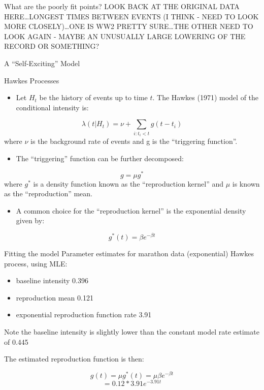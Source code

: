 \documentclass[
  ignorenonframetext,
]{beamer}
\providecommand{\tightlist}{%
  \setlength{\itemsep}{0pt}\setlength{\parskip}{0pt}}
\begin{document}
\begin{frame}{What are the poorly fit points?}
\protect\hypertarget{what-are-the-poorly-fit-points}{}
LOOK BACK AT THE ORIGINAL DATA HERE\ldots LONGEST TIMES BETWEEN EVENTS
(I THINK - NEED TO LOOK MORE CLOSELY)\ldots ONE IS WW2 PRETTY
SURE\ldots THE OTHER NEED TO LOOK AGAIN - MAYBE AN UNUSUALLY LARGE
LOWERING OF THE RECORD OR SOMETHING?
\end{frame}

\begin{frame}{A ``Self-Exciting'' Model}
\protect\hypertarget{a-self-exciting-model}{}
\begin{block}{Hawkes Processes}
\protect\hypertarget{hawkes-processes}{}
\begin{itemize}
\tightlist
\item
  Let \(H_t\) be the history of events up to time \(t\). The Hawkes
  (1971) model of the conditional intensity is:
\end{itemize}

\[\lambda(t|H_t) = \nu + \sum_{i:t_i<t} g(t - t_i)\] where \(\nu\) is
the background rate of events and g is the ``triggering function''.

\begin{itemize}
\tightlist
\item
  The ``triggering'' function can be further decomposed:
\end{itemize}

\[g = \mu g^*\] where \(g^*\) is a density function known as the
``reproduction kernel'' and \(\mu\) is known as the ``reproduction''
mean.

\begin{itemize}
\tightlist
\item
  A common choice for the ``reproduction kernel'' is the exponential
  density given by:
\end{itemize}

\[g^*(t) = \beta e^{-\beta t} \]
\end{block}
\end{frame}

\begin{frame}{Fitting the model}
\protect\hypertarget{fitting-the-model}{}
Parameter estimates for marathon data (exponential) Hawkes process,
using MLE:

\begin{itemize}
\tightlist
\item
  baseline intensity 0.396
\item
  reproduction mean 0.121
\item
  exponential reproduction function rate 3.91
\end{itemize}

Note the baseline intensity is slightly lower than the constant model
rate estimate of 0.445

The estimated reproduction function is then:

\[g(t) = \mu g^*(t) = \mu \beta e^{-\beta t} \]
\[ = 0.12 * 3.91 e^{-3.91 t} \]
\end{frame}
\end{document}
